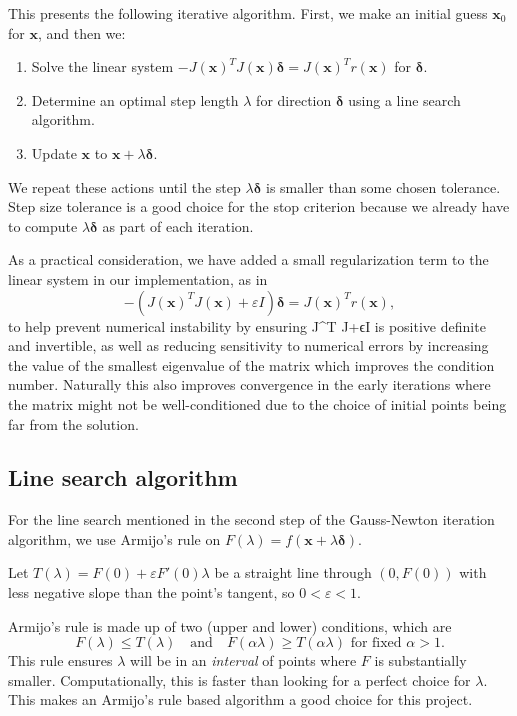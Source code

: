 \documentclass[12pt, a4paper]{article}
\newcommand{\bx}{{\boldsymbol{x}}}
\newcommand{\bd}{{\boldsymbol{\delta}}}
\begin{document}
This presents the following iterative algorithm. First, we make an initial guess $\bx_0$ for $\bx$, and then we:
\begin{enumerate}
    \item Solve the linear system $-{J(\bx)}^T J(\bx)\bd={J(\bx)}^T r(\bx)$ for $\bd$.
    \item Determine an optimal step length $\lambda$ for direction $\bd$ using a line search algorithm.
    \item Update $\bx$ to $\bx+\lambda\bd$.
\end{enumerate}
We repeat these actions until the step $\lambda\bd$ is smaller than some chosen tolerance. Step size tolerance is a good choice for the stop criterion because we already have to compute $\lambda\bd$ as part of each iteration.

As a practical consideration, we have added a small regularization term to the linear system in our implementation, as in \[-({J(\bx)}^T J(\bx)+\varepsilon I)\bd={J(\bx)}^T r(\bx),\] to help prevent numerical instability by ensuring J^T J+ϵI is positive definite and invertible, as well as reducing sensitivity to numerical errors by increasing the value of the smallest eigenvalue of the matrix which improves the condition number. Naturally this also improves convergence in the early iterations where the matrix might not be well-conditioned due to the choice of initial points being far from the solution.

\subsection{Line search algorithm}

For the line search mentioned in the second step of the Gauss-Newton iteration algorithm, we use Armijo's rule on $F(\lambda)=f(\bx+\lambda\bd)$.

Let $T(\lambda)=F(0)+\varepsilon F'(0)\lambda$ be a straight line through $(0,F(0))$ with less negative slope than the point's tangent, so $0<\varepsilon<1$.

Armijo's rule is made up of two (upper and lower) conditions, which are\[F(\lambda)\le T(\lambda)\quad\text{and}\quad F(\alpha\lambda)\ge T(\alpha\lambda)\text{ for fixed }\alpha>1.\]
This rule ensures $\lambda$ will be in an \textit{interval} of points where $F $ is substantially smaller. Computationally, this is faster than looking for a perfect choice for $\lambda$. This makes an Armijo's rule based algorithm a good choice for this project.
\end{document}
